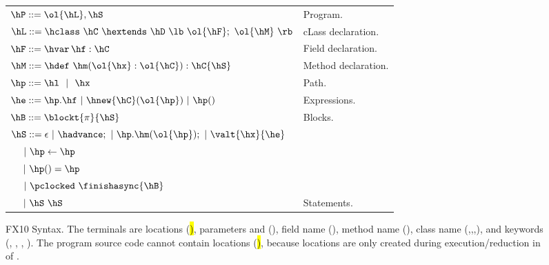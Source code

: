 \begin{figure*}[t]
\begin{center}
\begin{tabular}{|l|l|}
\hline

$\hP ::= \ol{\hL},\hS$ & Program. \\

$\hL ::= \hclass ~ \hC~\hextends~\hD~\lb~\ol{\hF};~\ol{\hM}~\rb$
& cLass declaration. \\

$\hF ::= \hvar\,\hf:\hC$
& Field declaration. \\

$\hM ::= \hdef\ \hm(\ol{\hx}:\ol{\hC}):\hC\{\hS\}$
& Method declaration. \\

$\hp ::= \hl ~~|~~ \hx$
& Path. \\ %

$\he ::=  \hp.\hf  ~|~ \hnew{\hC}(\ol{\hp}) ~|~ \hp()$
& Expressions. \\ %
$\hB ::= \blockt{\pi}{\hS}$
& Blocks. \\
$\hS ::=  \epsilon ~|~ \hadvance; ~|~ \hp.\hm(\ol{\hp});  ~|~ \valt{\hx}{\he}$ &\\
$~~~~|~ \hp \leftarrow \hp$ &\\
$~~~~|~ \hp() = \hp$ &\\
$~~~~|~ \pclocked~\finishasync{\hB}$&\\
$~~~~|~ \hS~\hS$
& Statements. \\ %

\hline
\end{tabular}
\end{center}
FX10 Syntax.
    The terminals are locations (\hl), parameters and \hthis (\hx), field name (\hf), method name (\hm), class name (\hB,\hC,\hD,\hObject),
        and keywords (\hhnew, \hfinish, \hasync, ).
    The program source code cannot contain locations (\hl), because locations are only created during execution/reduction in  of .

\label{Figure:syntax}



\end{figure*}
